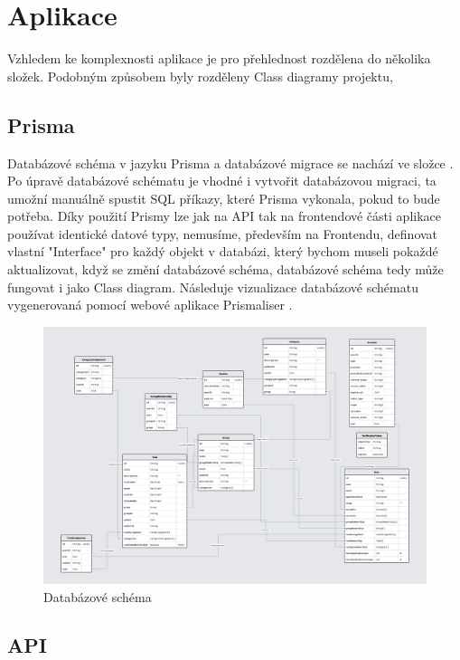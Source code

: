 \chapter{Aplikace}
Vzhledem ke komplexnosti aplikace je pro přehlednost rozdělena do několika složek. Podobným způsobem byly rozděleny Class diagramy projektu, 
\section{Prisma}
\label{sec:prisma}
Databázové schéma v jazyku Prisma a databázové migrace se nachází ve složce . Po úpravě databázové schématu je vhodné i vytvořit databázovou migraci, ta umožní manuálně spustit SQL příkazy, které Prisma vykonala, pokud to bude potřeba. Díky použití Prismy lze jak na API tak na frontendové části aplikace používat identické datové typy, nemusíme, především na Frontendu, definovat vlastní "Interface" pro každý objekt v databázi, který bychom museli pokaždé aktualizovat, když se změní databázové schéma, databázové schéma tedy může fungovat i jako Class diagram.
Následuje vizualizace databázové schématu vygenerovaná pomocí webové aplikace Prismaliser \cite{prismaliser}.

\begin{landscape}
\begin{figure}[hbt]
	\includegraphics[width=1\linewidth]{img/DB_schema.png}
	\caption{Databázové schéma}
\end{figure}
\end{landscape}
\section{API}
\label{sec:api}


